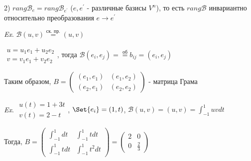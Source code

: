 \documentclass[12pt]{article}
\begin{document}
    2) $rang \mathcal{B}_e = rang \mathcal{B}_{e^\prime} $ ($e, e^\prime$ - различные базисы $V^n$), то есть $rang \mathcal{B}$ инвариантно относительно преобразования $e \to e^\prime$

    \vspace{3mm}
\textit{Ex}. $\mathcal{B}(u, v) \stackrel{\text{ск. пр.}}{=} (u, v)$

    $\begin{matrix}u = u_1 e_1 + u_2 e_2 \\ v = v_1 e_1 + v_2 e_2\end{matrix}$, тогда $\mathcal{B}(e_i, e_j) = \stackrel{\text{об}}{=} b_{ij} = (e_i, e_j)$

    Таким образом, $B = \begin{pmatrix}(e_1, e_1) & (e_1, e_2) \\ (e_2, e_1) & (e_2, e_2)\end{pmatrix}$ - матрица Грама

    \vspace{3mm}
\textit{Ex}. $\begin{matrix}u(t) = 1 + 3t \\ v(t) = 2 - t\end{matrix}$, $\Set{e_i} = (1, t)$, $\displaystyle \mathcal{B}(u, v) = (u, v) = \int_{-1}^1 uv dt$
    
    Тогда, $\displaystyle B = \begin{pmatrix}\int_{-1}^1 dt & \int_{-1}^1 t dt \\ \int_{-1}^1 t dt & \int_{-1}^1 t^2 dt\end{pmatrix} = \begin{pmatrix}2 & 0 \\ 0 & \frac{2}{3}\end{pmatrix}$
\end{document}
